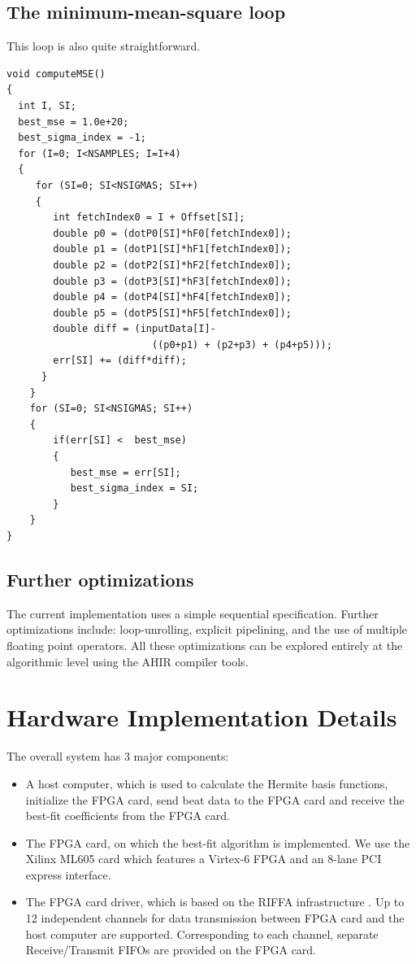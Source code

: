 \documentclass[runningheads]{llncs}
\begin{document}
\subsection{The minimum-mean-square loop} \label{sec:MMSE}

This loop is also quite straightforward.
\begin{verbatim}
void computeMSE()
{
  int I, SI;
  best_mse = 1.0e+20;
  best_sigma_index = -1;
  for (I=0; I<NSAMPLES; I=I+4)
  {
     for (SI=0; SI<NSIGMAS; SI++)
     {
        int fetchIndex0 = I + Offset[SI]; 
        double p0 = (dotP0[SI]*hF0[fetchIndex0]);
        double p1 = (dotP1[SI]*hF1[fetchIndex0]);
        double p2 = (dotP2[SI]*hF2[fetchIndex0]);
        double p3 = (dotP3[SI]*hF3[fetchIndex0]);
        double p4 = (dotP4[SI]*hF4[fetchIndex0]);
        double p5 = (dotP5[SI]*hF5[fetchIndex0]);
        double diff = (inputData[I]-
                         ((p0+p1) + (p2+p3) + (p4+p5)));
        err[SI] += (diff*diff);
      }
    }
    for (SI=0; SI<NSIGMAS; SI++)
    {
        if(err[SI] <  best_mse)
        {
           best_mse = err[SI];
           best_sigma_index = SI;
        }
    }
}
\end{verbatim}


\subsection{Further optimizations}

The current implementation uses a simple sequential specification.
Further optimizations include: loop-unrolling, explicit pipelining,
and the use of multiple floating point operators.  All these optimizations
can be explored entirely at the algorithmic level using the AHIR
compiler tools.

\section{Hardware Implementation Details}\label{s:implementation}

The overall system has 3 major components:
\begin{itemize}
\item A host computer, which is used to calculate the Hermite basis functions,
initialize the FPGA card, send beat data to the FPGA card and receive
the best-fit coefficients from the FPGA card.
\item The FPGA card, on which the best-fit algorithm is implemented.   We use the
Xilinx ML605 card which features a Virtex-6 FPGA and an 8-lane PCI express interface.
\item The FPGA card driver, which is based on the RIFFA infrastructure \cite{c:jacobsen13}. 
Up to 12 independent channels for data transmission between FPGA card and the host
computer are supported. Corresponding to each channel, separate Receive/Transmit FIFOs
are provided on the FPGA card. 
\end{itemize}
\end{document}
